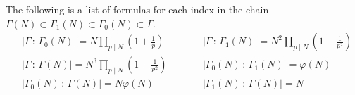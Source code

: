 \begin{corollary}\label{cor:indexListChain}
The following is a list of formulas for each index in the chain $\Gamma(N) \subset \Gamma_1(N) \subset \Gamma_0(N) \subset \Gamma$.
\begin{align*}
& \vert \Gamma \,:\,  \Gamma_0(N) \vert = N \prod_{p\mid N}(1 + \frac{1}{p}) \quad & & \quad
  \vert \Gamma \,:\,  \Gamma_1(N)\vert =  N^2 \prod_{p\mid N}(1 - \frac{1}{p^2})
  \\
& \vert\Gamma  \,:\,  \Gamma(N)\vert =  N^3  \prod_{p\mid N}(1 - \frac{1}{p^2}) \quad & & \quad
 \vert \Gamma_0(N) \,:\, \Gamma_1(N) \vert = \varphi(N)
 \\
& \vert \Gamma_0(N) \, : \, \Gamma(N)\vert =  N\varphi(N) \quad & & \quad
 \vert \Gamma_1(N) \,:\, \Gamma(N) \vert = N \\
\end{align*}

\end{corollary}

